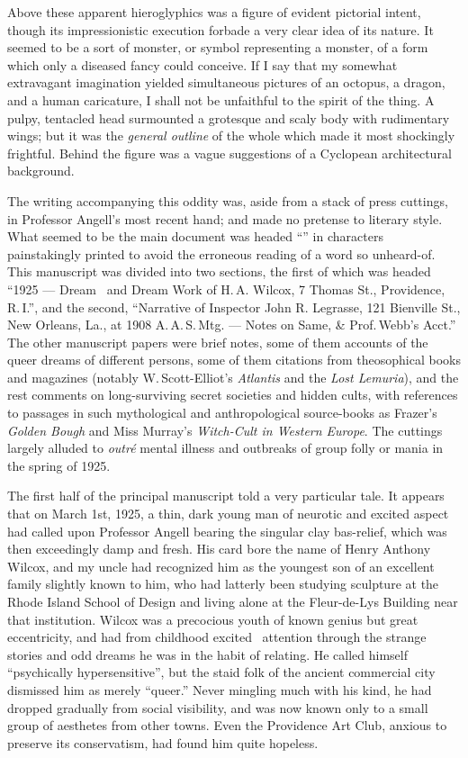 Above these apparent hieroglyphics was a figure of evident pictorial
intent, though its impressionistic execution forbade a very clear idea
of its nature. It seemed to be a sort of monster, or symbol representing
a monster, of a form which only a diseased fancy could conceive. If I
say that my somewhat extravagant imagination yielded simultaneous
pictures of an octopus, a dragon, and a human caricature, I shall not be
unfaithful to the spirit of the thing. A pulpy, tentacled head
surmounted a grotesque and scaly body with rudimentary wings; but it was
the \emph{general outline} of the whole which made it most shockingly
frightful. Behind the figure was a vague suggestions of a Cyclopean
architectural background.

The writing accompanying this oddity was, aside from a stack of press
cuttings, in Professor Angell's most recent hand; and made no pretense
to literary style. What seemed to be the main document was headed
``'' in characters painstakingly printed to avoid the
erroneous reading of a word so unheard-of. This manuscript was divided
into two sections, the first of which was headed ``1925 --- Dream \est\
and
Dream Work of H.\,A. Wilcox, 7 Thomas St., Providence, R.\,I.'', and the
second, ``Narrative of Inspector John R. Legrasse, 121 Bienville St.,
New Orleans, La., at 1908 A.\,A.\,S.\,Mtg. --- Notes on Same, \& Prof.\,Webb's
Acct.'' The other manuscript papers were brief notes, some of them
accounts of the queer dreams of different persons, some of them
citations from theosophical books and magazines (notably W.\,Scott-Elliot's \emph{Atlantis} and the \emph{Lost Lemuria}), and the rest comments on
long-surviving secret societies and hidden cults, with references to
passages in such mythological and anthropological source-books as
Frazer's \emph{Golden Bough} and Miss Murray's \emph{Witch-Cult in Western Europe}.
The cuttings largely alluded to \emph{outré} mental illness and outbreaks of
group folly or mania in the spring of 1925.

The first half of the principal manuscript told a very particular tale.
It appears that on March 1st, 1925, a thin, dark young man of neurotic
and excited aspect had called upon Professor Angell bearing the singular
clay bas-relief, which was then exceedingly damp and fresh. His card
bore the name of Henry Anthony Wilcox, and my uncle had recognized him
as the youngest son of an excellent family slightly known to him, who
had latterly been studying sculpture at the Rhode Island School of
Design and living alone at the Fleur-de-Lys Building near that
institution. Wilcox was a precocious youth of known genius but great
eccentricity, and had from childhood excited \est\ attention through the
strange stories and odd dreams he was in the habit of relating. He
called himself ``psychically hypersensitive'', but the staid folk of the
ancient commercial city dismissed him as merely ``queer.'' Never
mingling much with his kind, he had dropped gradually from social
visibility, and was now known only to a small group of aesthetes from
other towns. Even the Providence Art Club, anxious to preserve its
conservatism, had found him quite hopeless.

